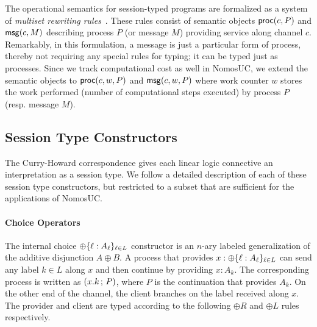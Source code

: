 The operational semantics for session-typed programs are formalized as a
system of \emph{multiset rewriting rules}~\cite{cervesato2009relating}.
These rules consist of semantic objects $\mathsf{proc}(c, P)$ and $\mathsf{msg}(c, M)$ describing
process $P$ (or message $M$) providing service along channel $c$.
Remarkably, in this formulation, a message is just a particular form of process,
thereby not requiring any special rules for typing; it can be typed just as processes.
Since we track computational cost as well in NomosUC, we extend the semantic objects
to $\mathsf{proc}(c, w, P)$ and $\mathsf{msg}(c, w, P)$ where work counter $w$ stores the work performed
(number of computational steps executed) by process $P$ (resp. message $M$).

\subsection{Session Type Constructors}
\label{subsec:constructors}

The Curry-Howard correspondence gives each linear logic connective an
interpretation as a session type.
We follow a detailed description of each of these session type constructors,
but restricted to a subset that are sufficient for the applications of NomosUC.

\paragraph*{\textbf{Choice Operators}}
The internal choice $\oplus \{ \ell : A_\ell \}_{\ell \in L}$ constructor
is an $n$-ary labeled generalization of the additive disjunction $A \oplus B$.
A process that provides $x : \oplus \{ \ell : A_\ell \}_{\ell \in L}$ can send
any label $k \in L$ along $x$ and then continue by providing $x : A_k$. The
corresponding process is written as $(x.k \, ; \, P)$, where
$P$ is the continuation that provides $A_k$.
On the other end of the channel, the client branches on the label received along $x$.
The provider and client are typed according to the following $\oplus R$ and $\oplus L$
rules respectively.
\parbox{\linewidth}{
}

